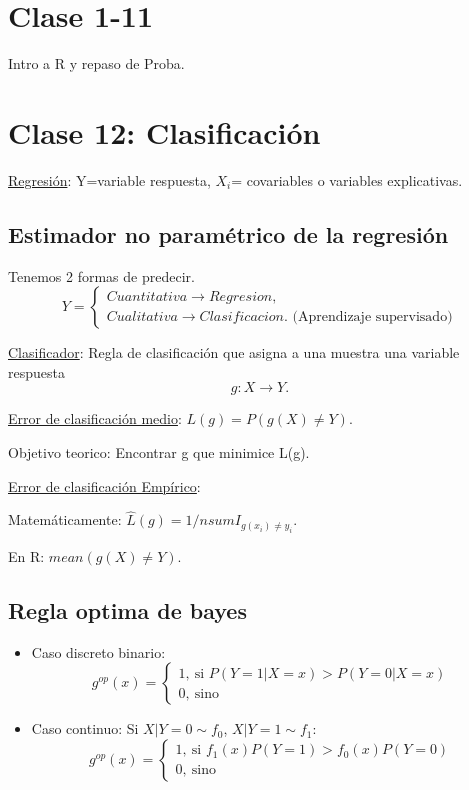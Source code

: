 \documentclass[a4paper,12pt]{article}
\theoremstyle{definition}
\numberwithin{prop}{section}
\theoremstyle{remark}
\numberwithin{ej_subseccion}{subsection}
\begin{document}
	\section*{Clase 1-11}
	Intro a R y repaso de Proba.
	
	\section*{Clase 12: Clasificación}
	\underline{Regresión}: Y=variable respuesta, $X_i$= covariables o variables explicativas.
	
	\subsection*{Estimador no paramétrico de la regresión}
	
	Tenemos 2 formas de predecir.
	$$Y=\begin{cases}
		Cuantitativa \longrightarrow Regresion, \\
		Cualitativa \longrightarrow Clasificacion. \text{ (Aprendizaje supervisado)}
	\end{cases}$$
	
	\underline{Clasificador}: Regla de clasificación que asigna a una muestra una variable respuesta
		$$g:X\longrightarrow Y.$$
		
	\underline{Error de clasificación medio}: $L(g)=P(g(X)\neq Y)$.


	Objetivo teorico: Encontrar g que minimice L(g).
	

	\underline{Error de clasificación Empírico}: 
		
	Matemáticamente: $\hat{L}(g)=1/n sum I_{g(x_i)\neq y_i}$.
		
	En R: $mean(g(X)\neq Y)$.
	
	\subsection*{Regla optima de bayes}
	
	\begin{itemize}
		\item Caso discreto binario: 
		$$g^{op}(x)=\begin{cases}
			1, \ \text{si } P(Y=1|X=x)>P(Y=0|X=x) \\
			0, \ \text{sino}
		\end{cases}$$
		\item Caso continuo: Si $X|Y=0\sim f_0$, $X|Y=1\sim f_1$:
		$$g^{op}(x)=\begin{cases}
		1, \ \text{si } f_1(x)P(Y=1)>f_0(x)P(Y=0) \\
		0, \ \text{sino}
	\end{cases}$$
	\end{itemize}
		
\end{document}
